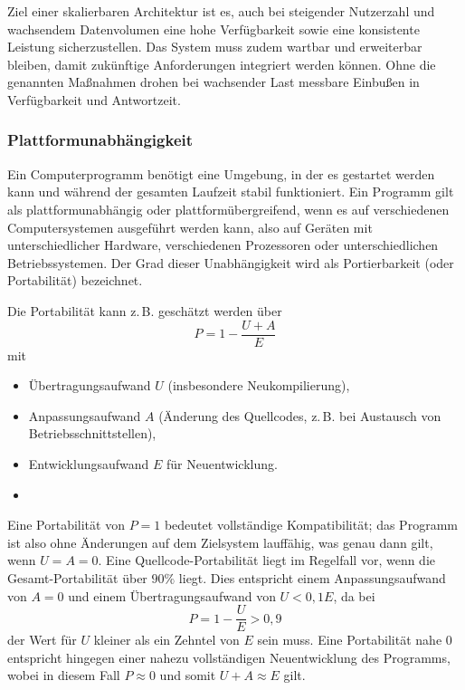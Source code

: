 Ziel einer skalierbaren Architektur ist es, auch bei steigender Nutzerzahl und
wachsendem Datenvolumen eine hohe Verfügbarkeit sowie eine konsistente Leistung
sicherzustellen. Das System muss zudem wartbar und erweiterbar bleiben, damit
zukünftige Anforderungen integriert werden können. Ohne die genannten Maßnahmen
drohen bei wachsender Last messbare Einbußen in Verfügbarkeit und Antwortzeit.
\cite{studysmarter2024skalierbare}
 
\subsubsection{Plattformunabhängigkeit}
 
Ein Computerprogramm benötigt eine Umgebung, in der es gestartet werden kann und
während der gesamten Laufzeit stabil funktioniert.
Ein Programm gilt als plattformunabhängig oder plattformübergreifend, wenn es auf
verschiedenen Computersystemen ausgeführt werden kann, also auf Geräten mit
unterschiedlicher Hardware, verschiedenen Prozessoren oder unterschiedlichen
Betriebssystemen.
Der Grad dieser Unabhängigkeit wird als Portierbarkeit (oder Portabilität)
bezeichnet.
\cite{boehm1976quality,isoiec25010}
 
Die Portabilität kann z.\,B. geschätzt werden über
\[
    P = 1 - \frac{U + A}{E}
\]
mit
\begin{itemize}
    \item Übertragungsaufwand $U$ (insbesondere Neukompilierung),
    \item Anpassungsaufwand $A$ (Änderung des Quellcodes, z.\,B. bei Austausch von
          Betriebsschnittstellen),
    \item Entwicklungsaufwand $E$ für Neuentwicklung.
    \item[] \vspace{0.5em}
\end{itemize}
 
Eine Portabilität von \( P = 1 \) bedeutet vollständige Kompatibilität; das Programm
ist also ohne Änderungen auf dem Zielsystem lauffähig, was genau dann gilt, wenn
\( U = A = 0 \).
Eine Quellcode-Portabilität liegt im Regelfall vor, wenn die Gesamt-Portabilität
über \( 90\% \) liegt. Dies entspricht einem Anpassungsaufwand von \( A = 0 \) und
einem Übertragungsaufwand von \( U < 0{,}1E \), da bei
\[
    P = 1 - \frac{U}{E} > 0{,}9
\]
der Wert für \( U \) kleiner als ein Zehntel von \( E \) sein muss.
Eine Portabilität nahe \( 0 \) entspricht hingegen einer nahezu vollständigen
Neuentwicklung des Programms, wobei in diesem Fall \( P \approx 0 \) und somit
\( U + A \approx E \) gilt.
\cite{wikipedia2024plattformunabhaengigkeit,mooney1997portability}
 
